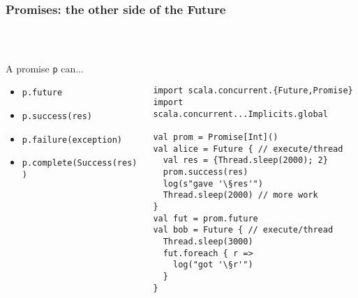 \documentclass[aspectratio=169]{beamer}
\begin{document}
\begin{frame}[fragile]\frametitle{Promises: the other side of the Future}
~\\[-8mm]
\begin{columns}
\begin{column}{0.46\textwidth}
\begin{block}{A promise \texttt{p} can...}
\begin{itemize}
  \item \texttt{p.future}
  \item \texttt{p.success(res)}
  \item \texttt{p.failure(exception)}
  \item \texttt{p.complete(Success(res))}
\end{itemize}
\end{block}
\end{column}\begin{column}{0.56\textwidth}
~\\
\begin{lstlisting}[emph={execute,sleep,log,Future,Promise,Try,
  Success,Failure,onComplete,Await,result,ready,success,failure},
  emph={[2]prom,fut}]
import scala.concurrent.{Future,Promise}
import scala.concurrent...Implicits.global

val prom = Promise[Int]()
val alice = Future { // execute/thread
  val res = {Thread.sleep(2000); 2}
  prom.success(res)
  log(s"gave '\§res'")
  Thread.sleep(2000) // more work
}
val fut = prom.future
val bob = Future { // execute/thread
  Thread.sleep(3000)
  fut.foreach { r =>
    log("got '\§r'")
  }
}
\end{lstlisting}
\end{column}

\end{columns}
\end{frame}

\end{document}
